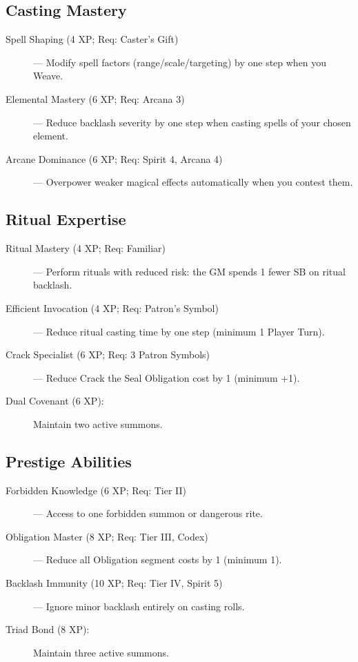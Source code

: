 \documentclass[11pt,twoside,openany]{book}
\begin{document}
\subsection*{Casting Mastery}

\begin{description}
\item[Spell Shaping (4 XP; Req: Caster's Gift)] — Modify spell factors (range/scale/targeting) by one step when you Weave.
\item[Elemental Mastery (6 XP; Req: Arcana 3)] — Reduce backlash severity by one step when casting spells of your chosen element.
\item[Arcane Dominance (6 XP; Req: Spirit 4, Arcana 4)] — Overpower weaker magical effects automatically when you contest them.
\end{description}

\subsection*{Ritual Expertise}

\begin{description}
\item[Ritual Mastery (4 XP; Req: Familiar)] — Perform rituals with reduced risk: the GM spends 1 fewer SB on ritual backlash.
\item[Efficient Invocation (4 XP; Req: Patron's Symbol)] — Reduce ritual casting time by one step (minimum 1 Player Turn).
\item[Crack Specialist (6 XP; Req: 3 Patron Symbols)] — Reduce Crack the Seal Obligation cost by 1 (minimum +1).
\item[Dual Covenant (6 XP):] Maintain two active summons.
\end{description}

\subsection*{Prestige Abilities}

\begin{description}
\item[Forbidden Knowledge (6 XP; Req: Tier II)] — Access to one forbidden summon or dangerous rite.
\item[Obligation Master (8 XP; Req: Tier III, Codex)] — Reduce all Obligation segment costs by 1 (minimum 1).
\item[Backlash Immunity (10 XP; Req: Tier IV, Spirit 5)] — Ignore minor backlash entirely on casting rolls.
\item[Triad Bond (8 XP):] Maintain three active summons.
\end{description}
\end{document}
